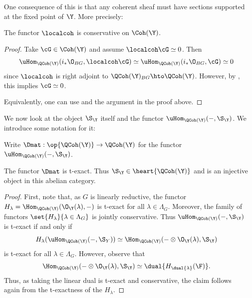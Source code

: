 \documentclass{amsart}
\begin{document}
  One consequence of this is that
  any coherent sheaf must have sections supported
  at the fixed point of \(\Y\). More precisely:

  \begin{cor}
    The functor \(\localcoh\) is conservative on \(\Coh(\Y)\).
  \end{cor}
  \begin{proof}
    Take \(\cG \in \Coh(\Y)\) and assume \(\localcoh \cG \simeq 0\).
    Then 
    \begin{displaymath}
      \uHom_{\QCoh(\Y)}(i_\ast \O_{BG}, \localcoh \cG) \simeq \uHom_{\QCoh(\Y)}(i_\ast \O_{BG}, \cG) \simeq 0
    \end{displaymath}
    since \(\localcoh\) is right adjoint to \(\QCoh(\Y)_{BG} \hto \QCoh(\Y)\).
    However, by , this implies
    \(\cG \simeq 0\).

    Equivalently, one can use \cite[Theorem 2.1]{foxby_iyengar:2003}
    and the argument in the proof above.
  \end{proof}


  We now look at the object \(\S_\Y\) itself and the functor
  \(\uHom_{\QCoh(\Y)}(-, \S_\Y)\). We introduce some notation for it:

  \begin{notat}
    Write \(\Dmat: \op{\QCoh(\Y)} \to \QCoh(\Y)\) for
    the functor \(\uHom_{\QCoh(\Y)}(-, \S_\Y)\).
  \end{notat}

    \begin{prop}\label{prop:s_inj}
    The functor \(\Dmat\) is t-exact.
    Thus \(\S_\Y \in \heart{\QCoh(\Y)}\) and is an injective object in
    this abelian category.
  \end{prop}
  \begin{proof}
    First, note that, as \(G\) is linearly reductive,
    the functor \(H_\lambda =\Hom_{\QCoh(\Y)}(\O_\Y(\lambda), -)\) is t-exact
    for all \(\lambda \in \Lambda_G\). Moreover, the
    family of functors \(\set{H_\lambda}{\lambda \in \Lambda_G}\)
    is jointly conservative. Thus \(\uHom_{\QCoh(\Y)}(-, \S_\Y)\)
    is t-exact if and only if
    \begin{displaymath}
      H_\lambda(\uHom_{\QCoh(\Y)}(-, \S_Y)) \simeq \Hom_{\QCoh(\Y)}(- \otimes \O_\Y(\lambda), \S_\Y)
    \end{displaymath}
    is t-exact for all \(\lambda \in \Lambda_G\). However, observe that
    \begin{displaymath}
      \Hom_{\QCoh(\Y)}(- \otimes \O_\Y(\lambda), \S_\Y) \simeq
      \dual{H_{\dual{\lambda}}(\F)}.
    \end{displaymath}
    Thus, as taking the linear dual is t-exact and 
    conservative, the claim follows again from the 
    t-exactness of the \(H_\lambda\).
  \end{proof}
\end{document}

